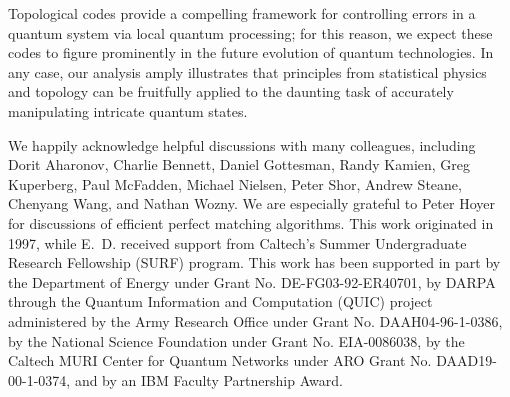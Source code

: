 Topological codes provide a compelling framework for controlling errors in a quantum system via local quantum processing; for this reason, we expect these codes to figure prominently in the future evolution of quantum technologies. In any case, our analysis amply illustrates that principles from statistical physics and topology can be fruitfully applied to the daunting task of accurately manipulating intricate quantum states.


\acknowledgments

We happily acknowledge helpful discussions with many colleagues, including Dorit Aharonov, Charlie Bennett, Daniel Gottesman, Randy Kamien, Greg Kuperberg, Paul McFadden, Michael Nielsen, Peter Shor, Andrew Steane, Chenyang Wang, and Nathan Wozny.  We are especially grateful to Peter Hoyer for discussions of efficient perfect matching algorithms. This work originated in 1997, while E.~D. received support from Caltech's Summer
Undergraduate Research Fellowship (SURF) program. This work has been supported in part by the Department of Energy under Grant No. DE-FG03-92-ER40701, by DARPA through the Quantum Information and Computation (QUIC) project administered by the Army Research Office under Grant No. DAAH04-96-1-0386, by the National Science Foundation under Grant No. EIA-0086038, by the Caltech MURI Center for Quantum Networks under ARO Grant No. DAAD19-00-1-0374, and by an IBM Faculty Partnership Award. 


